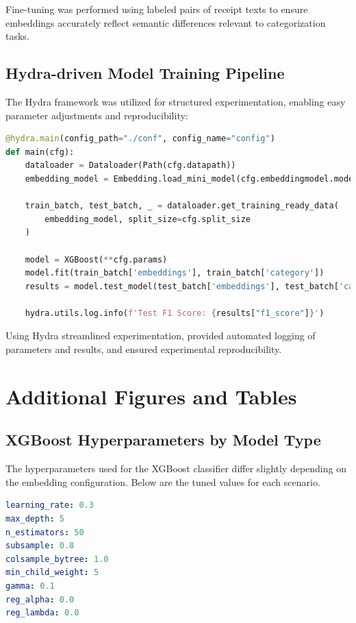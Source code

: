 \documentclass{SGGW-thesis-EN}
\begin{document}
Fine-tuning was performed using labeled pairs of receipt texts to ensure embeddings accurately reflect semantic differences relevant to categorization tasks.

\subsection{Hydra-driven Model Training Pipeline}

The Hydra framework was utilized for structured experimentation, enabling easy parameter adjustments and reproducibility:


\begin{lstlisting}[language=Python, caption={Training pipeline}, label={lst:preprocessing}]
@hydra.main(config_path="./conf", config_name="config")
def main(cfg):
    dataloader = Dataloader(Path(cfg.datapath))
    embedding_model = Embedding.load_mini_model(cfg.embeddingmodel.model_path)

    train_batch, test_batch, _ = dataloader.get_training_ready_data(
        embedding_model, split_size=cfg.split_size
    )

    model = XGBoost(**cfg.params)
    model.fit(train_batch['embeddings'], train_batch['category'])
    results = model.test_model(test_batch['embeddings'], test_batch['category'])

    hydra.utils.log.info(f'Test F1 Score: {results["f1_score"]}')
\end{lstlisting}
\label{code:hydra_pipeline_example}

Using Hydra streamlined experimentation, provided automated logging of parameters and results, and ensured experimental reproducibility.



\section{Additional Figures and Tables}
\subsection{XGBoost Hyperparameters by Model Type}

\noindent The hyperparameters used for the XGBoost classifier differ slightly depending on the embedding configuration.
Below are the tuned values for each scenario.

\begin{lstlisting}[language=yaml, caption={XGBoost hyperparameters – BERT model}, label={lst:bert_params}]
learning_rate: 0.3
max_depth: 5
n_estimators: 50
subsample: 0.8
colsample_bytree: 1.0
min_child_weight: 5
gamma: 0.1
reg_alpha: 0.0
reg_lambda: 0.0
\end{lstlisting}
\end{document}
